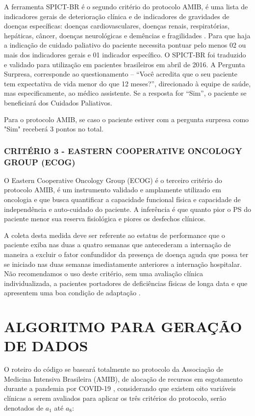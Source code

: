 \documentclass[12pt]{article}
\begin{document}
A ferramenta SPICT-BR é o segundo critério do protocolo AMIB, é uma lista de indicadores gerais de deterioração clínica e de indicadores de gravidades de doenças específicas: doenças
cardiovasculares, doenças renais, respiratórias, hepáticas, câncer, doenças neurológicas e
demências e fragilidades \cite{rodriguez2021pergunta}. Para que haja a indicação de cuidado paliativo do paciente necessita pontuar pelo menos 02 ou mais dos indicadores gerais e 01 indicador específico. O SPICT-BR foi traduzido e validado para utilização em pacientes brasileiros em abril de 2016. A Pergunta Surpresa, corresponde ao questionamento – “Você acredita que o seu paciente tem expectativa de vida menor do que 12 meses?”, direcionado à equipe de saúde, mas especificamente, ao médico assistente. Se a resposta for “Sim”, o paciente se beneficiará dos Cuidados Paliativos.

Para o protocolo AMIB, se caso o paciente estiver com a pergunta surpresa como "Sim" receberá 3 pontos no total.

\subsubsection{CRITÉRIO 3 - EASTERN COOPERATIVE ONCOLOGY GROUP (ECOG)}
O Eastern Cooperative Oncology Group (ECOG) é o terceiro critério do protocolo AMIB, é um
instrumento validado e amplamente utilizado em oncologia e que busca quantificar a capacidade funcional física e capacidade de independência e auto-cuidado do paciente. A inferência é que quanto pior o PS do paciente menor sua reserva fisiológica e piores os desfechos clínicos.

A coleta desta medida deve ser referente ao estatus de performance que o paciente exiba nas duas a quatro semanas que antecederam a internação de maneira a excluir o fator confundidor da presença de doença aguda que possa ter se iniciado nas duas semanas imediatamente anteriores a internação hospitalar. Não recomendamos o uso deste critério, sem uma avaliação clínica individualizada, a pacientes portadores de deficiências físicas de longa data e que apresentem uma boa condição de adaptação \cite{pinto2000physician}.

\section{ALGORITMO PARA GERAÇÃO DE DADOS}

O roteiro do código se baseará totalmente no protocolo da Associação de Medicina Intensiva Brasileira (AMIB), de alocação de recursos em esgotamento durante a pandemia por COVID-19 \cite{kretzer2020recomendaccoes}, considerando que existem oito variáveis clínicas a serem avaliados para aplicar os três critérios do protocolo, serão denotados de $a_1$ até $a_8$:
\end{document}
